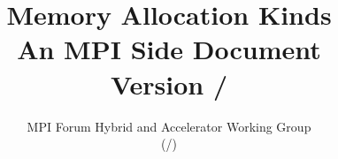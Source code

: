 \documentclass[twoside,11pt,fleqn]{book}
\def\disclaim{{%
  }}
\begin{document}
\title{Memory Allocation Kinds \\
{\Large An MPI Side Document}\\
{\Large Version \MEMALLOCVERSION/}\\
}

\author{
}

\date{
MPI Forum Hybrid and Accelerator Working Group\\
(\MEMALLOCDATE/)\\[2ex]
\vspace{0.2in}
}

\frontmatter
\maketitle

\pagestyle{plain} 
\setcounter{page}{2} 
\hfuzz=5pt
 






\contentstrue
\pagestyle{plain}
\tableofcontents
\contentsfalse


\mainmatter  %
\withlinenumbers
\setpagewiselinenumbers
\linenumbers

\pagestyle{fancy}  
\fancyhf{}
\fancyfoot[C]{\thepage\\
\disclaim}

\startchap


\newpage 
%
{}


\end{document}
